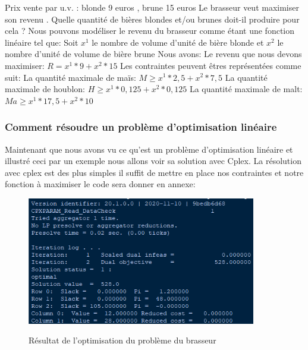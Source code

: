 Prix vente par u.v. : blonde 9 euros , brune 15 euros
Le brasseur veut maximiser son revenu .\newline
Quelle quantité de bières blondes et/ou brunes doit-il produire pour cela ?\newline
\newline
Nous pouvons modéliser le revenu du brasseur comme étant une fonction linéaire tel que:\newline
Soit $x^{1}$ le nombre de volume d'unité de bière blonde et $x^{2}$ le nombre d'unité de volume de bière brune\newline
Nous avons:\newline\newline
Le revenu que nous devons maximiser: $R = x^{1}*9 + x^{2}*15$\newline\newline
Les contraintes peuvent êtres représentées comme suit:\newline\newline
La quantité maximale de maïs: $M \geq x^{1}*2,5+x^{2}*7,5$\newline
La quantité maximale de houblon: $H \geq x^{1}*0,125+x^{2}*0,125$\newline
La quantité maximale de malt: $Ma \geq x^{1}*17,5+x^{2}*10$\newline\newline

\subsubsection{Comment résoudre un problème d'optimisation linéaire}

 Maintenant que nous avons vu ce qu'est un problème d'optimisation linéaire et illustré ceci par un exemple nous allons voir sa solution avec Cplex.\newline
 La résolution avec cplex est des plus simples il suffit de mettre en place nos contraintes et notre fonction à maximiser le code sera donner en annexe:

 \begin{figure}[h]
   \begin{center}
 \includegraphics[width=10cm]{./images/Brasseur_Resolution.png}\label{Resultat_Brasseur}
 \caption{Résultat de l'optimisation du problème du brasseur}
 \end{center}
 \end{figure}

